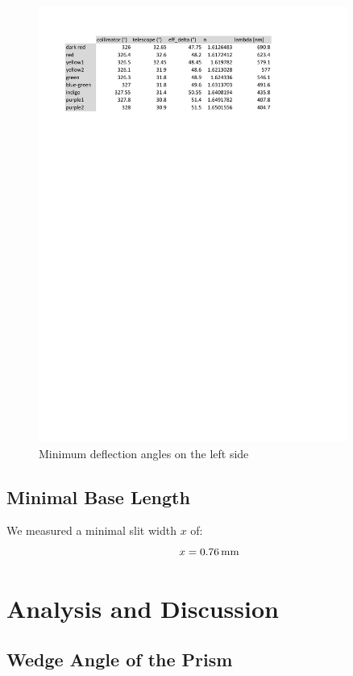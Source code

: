 \documentclass{scrreprt}
\newcommand{\unit}[1]{\ensuremath{\, \mathrm{#1}}}
\begin{document}
\begin{figure}[H]
	\centering
  \includegraphics[width=0.9\textwidth]{diag/left.pdf}
	\caption{Minimum deflection angles on the left side}
	\label{fig:left}
\end{figure}
\subsection{Minimal Base Length}
We measured a minimal slit width $x$ of:
\begin{equation}
	x = 0.76\unit{mm}
\notag
\end{equation}

\section{Analysis and Discussion}

\subsection{Wedge Angle of the Prism}
\end{document}

